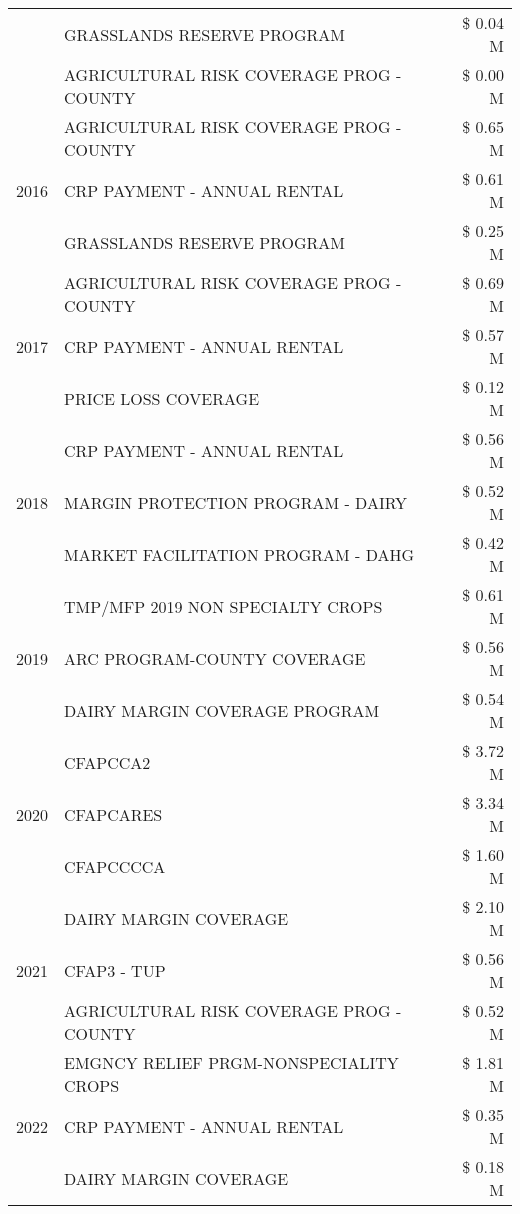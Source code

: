 \begin{tabular}{llr}
 & GRASSLANDS RESERVE PROGRAM & \$ 0.04 M \\
 & AGRICULTURAL RISK COVERAGE PROG - COUNTY & \$ 0.00 M \\
\cline{1-3}
\multirow[t]{3}{*}{2016} & AGRICULTURAL RISK COVERAGE PROG - COUNTY & \$ 0.65 M \\
 & CRP PAYMENT - ANNUAL RENTAL & \$ 0.61 M \\
 & GRASSLANDS RESERVE PROGRAM & \$ 0.25 M \\
\cline{1-3}
\multirow[t]{3}{*}{2017} & AGRICULTURAL RISK COVERAGE PROG - COUNTY & \$ 0.69 M \\
 & CRP PAYMENT - ANNUAL RENTAL & \$ 0.57 M \\
 & PRICE LOSS COVERAGE & \$ 0.12 M \\
\cline{1-3}
\multirow[t]{3}{*}{2018} & CRP PAYMENT - ANNUAL RENTAL & \$ 0.56 M \\
 & MARGIN PROTECTION PROGRAM - DAIRY & \$ 0.52 M \\
 & MARKET FACILITATION PROGRAM - DAHG & \$ 0.42 M \\
\cline{1-3}
\multirow[t]{3}{*}{2019} & TMP/MFP 2019 NON SPECIALTY CROPS & \$ 0.61 M \\
 & ARC PROGRAM-COUNTY COVERAGE & \$ 0.56 M \\
 & DAIRY MARGIN COVERAGE PROGRAM & \$ 0.54 M \\
\cline{1-3}
\multirow[t]{3}{*}{2020} & CFAPCCA2 & \$ 3.72 M \\
 & CFAPCARES & \$ 3.34 M \\
 & CFAPCCCCA & \$ 1.60 M \\
\cline{1-3}
\multirow[t]{3}{*}{2021} & DAIRY MARGIN COVERAGE & \$ 2.10 M \\
 & CFAP3 - TUP & \$ 0.56 M \\
 & AGRICULTURAL RISK COVERAGE PROG - COUNTY & \$ 0.52 M \\
\cline{1-3}
\multirow[t]{3}{*}{2022} & EMGNCY RELIEF PRGM-NONSPECIALITY CROPS & \$ 1.81 M \\
 & CRP PAYMENT - ANNUAL RENTAL & \$ 0.35 M \\
 & DAIRY MARGIN COVERAGE & \$ 0.18 M \\
\cline{1-3}
\bottomrule
\end{tabular}

